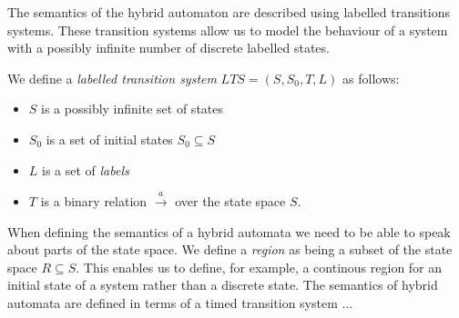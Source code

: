 The semantics of the hybrid automaton are described using labelled transitions systems. These transition systems allow us to model the behaviour of a system with a possibly infinite number of discrete labelled states. 
\medskip
\begin{mydef}
We define a \emph{labelled transition system} $LTS = (S,S_0,T,L)$ as follows:
\begin{itemize}

\item $S$ is a possibly infinite set of states

\item $S_0$ is a set of initial states $S_0 \subseteq S$

\item $L$ is a set of \emph{labels}

\item $T$ is a binary relation $\xrightarrow{a}$ over the state space $S$.

\end{itemize}
\end{mydef}
\medskip
When defining the semantics of a hybrid automata we need to be able to speak about parts of the state space.  We define a \emph{region} as being a subset of the state space $R \subseteq S$.  This enables us to define, for example, a continous region for an initial state of a system rather than a discrete state. The semantics of hybrid automata are defined in terms of a timed transition system ...


